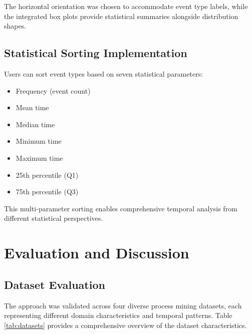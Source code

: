 \documentclass[11pt,a4paper]{article}
\begin{document}
The horizontal orientation was chosen to accommodate event type labels, while the integrated box plots provide statistical summaries alongside distribution shapes.

\subsection{Statistical Sorting Implementation}

Users can sort event types based on seven statistical parameters:

\begin{itemize}
    \item Frequency (event count)
    \item Mean time
    \item Median time
    \item Minimum time
    \item Maximum time
    \item 25th percentile (Q1)
    \item 75th percentile (Q3)
\end{itemize}

This multi-parameter sorting enables comprehensive temporal analysis from different statistical perspectives.

\section{Evaluation and Discussion}
\label{sec:evaluation}

\subsection{Dataset Evaluation}

The approach was validated across four diverse process mining datasets, each representing different domain characteristics and temporal patterns. Table \ref{tab:datasets} provides a comprehensive overview of the dataset characteristics.
\end{document}
